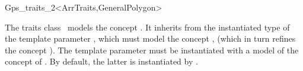 \ccRefPageBegin

\begin{ccRefClass}{Gps_traits_2<ArrTraits,GeneralPolygon>}

\ccThreeToTwo

\ccDefinition
The traits class \ccRefName\ models the concept 
. It inherits from the instantiated 
type of the template parameter , which must model the 
concept , (which in turn refines
the concept ). The template parameter
 must be instantiated with a model of the concept
of . By default, the latter is instantiated by
.

 
\ccIsModel

\end{ccRefClass}
\ccRefPageEnd
